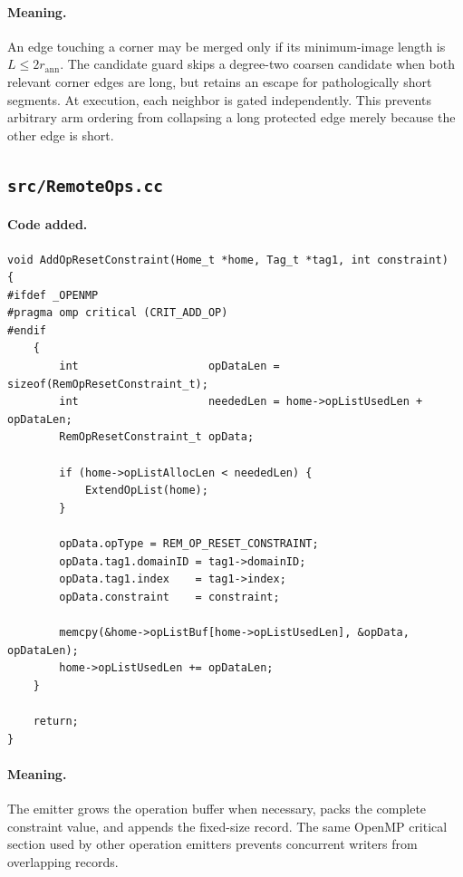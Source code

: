 \documentclass[11pt]{article}
\begin{document}
\paragraph{Meaning.}
An edge touching a corner may be merged only if its minimum-image length is
$L\leq2r_{\mathrm{ann}}$.  The candidate guard skips a degree-two coarsen
candidate when both relevant corner edges are long, but retains an escape for
pathologically short segments.  At execution, each neighbor is gated
independently.  This prevents arbitrary arm ordering from collapsing a long
protected edge merely because the other edge is short.

\subsection{\texttt{src/RemoteOps.cc}}

\paragraph{Code added.}

\begin{lstlisting}[style=cpp]
void AddOpResetConstraint(Home_t *home, Tag_t *tag1, int constraint)
{
#ifdef _OPENMP
#pragma omp critical (CRIT_ADD_OP)
#endif
    {
        int                    opDataLen = sizeof(RemOpResetConstraint_t);
        int                    neededLen = home->opListUsedLen + opDataLen;
        RemOpResetConstraint_t opData;

        if (home->opListAllocLen < neededLen) {
            ExtendOpList(home);
        }

        opData.opType = REM_OP_RESET_CONSTRAINT;
        opData.tag1.domainID = tag1->domainID;
        opData.tag1.index    = tag1->index;
        opData.constraint    = constraint;

        memcpy(&home->opListBuf[home->opListUsedLen], &opData, opDataLen);
        home->opListUsedLen += opDataLen;
    }

    return;
}
\end{lstlisting}

\paragraph{Meaning.}
The emitter grows the operation buffer when necessary, packs the complete
constraint value, and appends the fixed-size record.  The same OpenMP critical
section used by other operation emitters prevents concurrent writers from
overlapping records.
\end{document}
